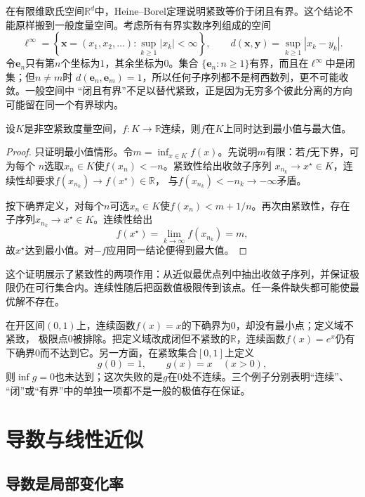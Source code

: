 在有限维欧氏空间$\mathbb{R}^d$中，Heine--Borel定理说明紧致等价于闭且有界。这个结论不能原样搬到一般度量空间。考虑所有有界实数序列组成的空间
\[   \ell^\infty   =   \left\{\bm{x}=(x_1,x_2,\ldots):   \sup_{k\geq1}|x_k|<\infty\right\},   \qquad   d(\bm{x},\bm{y})=\sup_{k\geq1}|x_k-y_k|. \]
令$\bm{e}_n$只有第$n$个坐标为$1$，其余坐标为$0$。集合 $\{\bm{e}_n:n\geq1\}$有界，而且在$\ell^\infty$中是闭集；但$n\neq m$时 $d(\bm{e}_n,\bm{e}_m)=1$，所以任何子序列都不是柯西数列，更不可能收敛。一般空间中 “闭且有界”不足以替代紧致，正是因为无穷多个彼此分离的方向可能留在同一个有界球内。
\begin{theorem}[紧致集上的极值定理]
\label{thm:analysis-extreme-value}
设$K$是非空紧致度量空间，$f:K\to\mathbb{R}$连续，则$f$在$K$上同时达到最小值与最大值。
\end{theorem}
\begin{proof}
只证明最小值情形。令$m=\inf_{x\in K}f(x)$。先说明$m$有限：若$f$无下界，可为每个 $n$选取$x_n\in K$使$f(x_n)<-n$。紧致性给出收敛子序列 $x_{n_k}\to x^\star\in K$，连续性却要求$f(x_{n_k})\to f(x^\star)\in\mathbb{R}$， 与$f(x_{n_k})<-n_k\to-\infty$矛盾。

按下确界定义，对每个$n$可选$x_n\in K$使$f(x_n)<m+1/n$。再次由紧致性，存在子序列$x_{n_k}\to x^\star\in K$。连续性给出
\[   f(x^\star)   =\lim_{k\to\infty}f(x_{n_k})   =m, \]
故$x^\star$达到最小值。对$-f$应用同一结论便得到最大值。
\end{proof}

这个证明展示了紧致性的两项作用：从近似最优点列中抽出收敛子序列，并保证极限仍在可行集合内。连续性随后把函数值极限传到该点。任一条件缺失都可能使最优解不存在。
\begin{example}[极值存在条件怎样失效]
\label{ex:analysis-extrema-failures}
在开区间$(0,1)$上，连续函数$f(x)=x$的下确界为$0$，却没有最小点；定义域不紧致， 极限点$0$被排除。把定义域改成闭但不紧致的$\mathbb{R}$，连续函数$f(x)=e^x$仍有下确界$0$而不达到它。另一方面，在紧致集合$[0,1]$上定义
\[   g(0)=1,\qquad g(x)=x\quad(x>0), \]
则$\inf g=0$也未达到；这次失败的是$g$在$0$处不连续。三个例子分别表明“连续”、 “闭”或“有界”中的单独一项都不是一般的极值存在保证。
\end{example}
\section{导数与线性近似}
\label{sec:analysis-derivatives-linear-approximation}
\subsection{导数是局部变化率}

